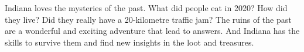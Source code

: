 \begin{npcBox}[title=Indiana - a Lost looter]
    \begin{stressSection}
    \end{stressSection}
    \begin{tabularx}{\textwidth}{ XX }
    \end{tabularx}

    \begin{consequences}
    \item {}
    \item {}
    \item {}
    \end{consequences}

    \begin{npcDescription}
    Indiana loves the mysteries of the past. What did people eat in 2020? How did they live? Did they really have a 20-kilometre traffic jam?
    The ruins of the past are a wonderful and exciting adventure that lead to answers. And Indiana has the skills to survive them and find new insights in the loot and treasures.
    \end{npcDescription}

\end{npcBox}

